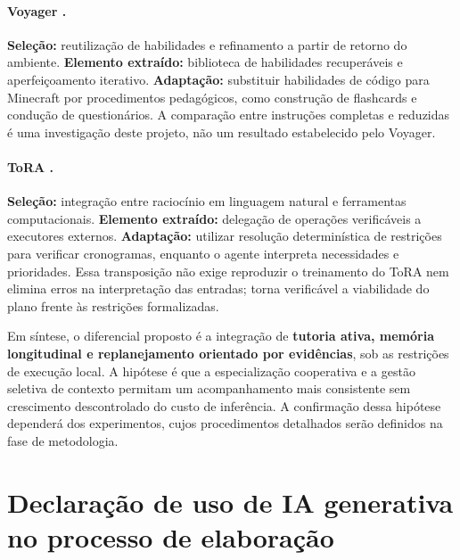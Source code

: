\documentclass[12pt]{article}
\begin{document}
\paragraph{Voyager \citep{wang2023voyager}.}
\textbf{Seleção:} reutilização de habilidades e refinamento a partir de retorno do ambiente. \textbf{Elemento extraído:} biblioteca de habilidades recuperáveis e aperfeiçoamento iterativo. \textbf{Adaptação:} substituir habilidades de código para Minecraft por procedimentos pedagógicos, como construção de flashcards e condução de questionários. A comparação entre instruções completas e reduzidas é uma investigação deste projeto, não um resultado estabelecido pelo Voyager.

\paragraph{ToRA \citep{gou2024tora}.}
\textbf{Seleção:} integração entre raciocínio em linguagem natural e ferramentas computacionais. \textbf{Elemento extraído:} delegação de operações verificáveis a executores externos. \textbf{Adaptação:} utilizar resolução determinística de restrições para verificar cronogramas, enquanto o agente interpreta necessidades e prioridades. Essa transposição não exige reproduzir o treinamento do ToRA nem elimina erros na interpretação das entradas; torna verificável a viabilidade do plano frente às restrições formalizadas.

Em síntese, o diferencial proposto é a integração de \textbf{tutoria ativa, memória longitudinal e replanejamento orientado por evidências}, sob as restrições de execução local. A hipótese é que a especialização cooperativa e a gestão seletiva de contexto permitam um acompanhamento mais consistente sem crescimento descontrolado do custo de inferência. A confirmação dessa hipótese dependerá dos experimentos, cujos procedimentos detalhados serão definidos na fase de metodologia.

\clearpage
\section*{Declaração de uso de IA generativa no processo de elaboração}
\end{document}
